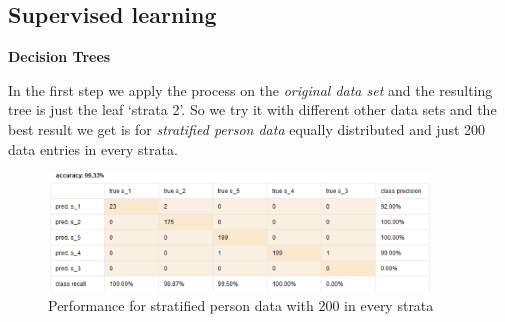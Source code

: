 \setlength{\parindent}{0em}

\subsection{Supervised learning}

\textbf{Decision Trees} \label{subsec: decisiontree}
%
%
%

In the first step we apply the process on the \textit{original data set} and the resulting tree is just the leaf `strata 2'. So we try it with different other data sets and the best result we get is for \textit{stratified person data} equally distributed and just 200 data entries in every strata.

\begin{figure}[H]
\centering
\includegraphics[width = 0.9\textwidth]{Dec200eqPrec.PNG}
\caption{Performance for stratified person data with 200 in every strata}
\label{fig:DecVec200}
\end{figure}


